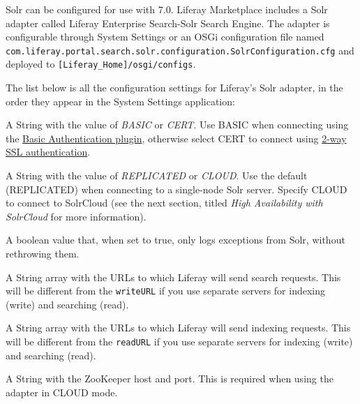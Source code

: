 Solr can be configured for use with 7.0. Liferay Marketplace includes a
Solr adapter called Liferay Enterprise Search-Solr Search Engine. The
adapter is configurable through System Settings or an OSGi configuration
file named
\texttt{com.liferay.portal.search.solr.configuration.SolrConfiguration.cfg}
and deployed to \texttt{{[}Liferay\_Home{]}/osgi/configs}.

The list below is all the configuration settings for Liferay's Solr
adapter, in the order they appear in the System Settings application:

\begin{description}
\tightlist
\item[\texttt{authenticationMode=BASIC}]
A String with the value of \emph{BASIC} or \emph{CERT}. Use BASIC when
connecting using the
\href{https://cwiki.apache.org/confluence/display/solr/Basic+Authentication+Plugin}{Basic
Authentication plugin}, otherwise select CERT to connect using
\href{https://cwiki.apache.org/confluence/display/solr/Enabling+SSL}{2-way
SSL authentication}.
\item[\texttt{clientType=REPLICATED}]
A String with the value of \emph{REPLICATED} or \emph{CLOUD}. Use the
default (REPLICATED) when connecting to a single-node Solr server.
Specify CLOUD to connect to SolrCloud (see the next section, titled
\emph{High Availability with SolrCloud} for more information).
\item[\texttt{logExceptionsOnly=true}]
A boolean value that, when set to true, only logs exceptions from Solr,
without rethrowing them.
\item[\texttt{readURL=http://localhost:8983/solr/liferay}]
A String array with the URLs to which Liferay will send search requests.
This will be different from the \texttt{writeURL} if you use separate
servers for indexing (write) and searching (read).
\item[\texttt{writeURL=http://localhost:8983/solr/liferay}]
A String array with the URLs to which Liferay will send indexing
requests. This will be different from the \texttt{readURL} if you use
separate servers for indexing (write) and searching (read).
\item[\texttt{zkHost=localhost:9983}]
A String with the ZooKeeper host and port. This is required when using
the adapter in CLOUD mode.
\end{description}
